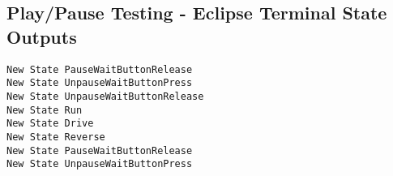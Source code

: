 \subsection{Play/Pause Testing - Eclipse Terminal State Outputs}\label{app:play_pause_states}
\begin{verbatim}
New State PauseWaitButtonRelease 
New State UnpauseWaitButtonPress 
New State UnpauseWaitButtonRelease 
New State Run 
New State Drive 
New State Reverse 
New State PauseWaitButtonRelease 
New State UnpauseWaitButtonPress
\end{verbatim}